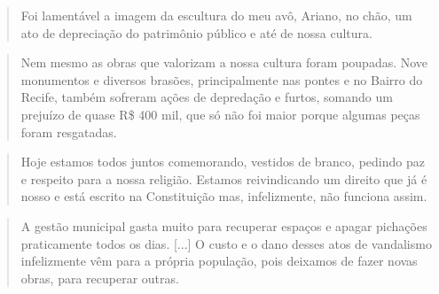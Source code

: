 \begin{escolha}
\item
\begin{quote}
Foi lamentável a imagem da escultura do meu avô, Ariano, no chão, um 
ato de depreciação do patrimônio público e até de nossa cultura.

\end{quote}

\item
\begin{quote}
Nem mesmo as obras que valorizam a nossa cultura foram poupadas. Nove 
monumentos e diversos brasões, principalmente nas pontes e no Bairro 
do Recife, também sofreram ações de depredação e furtos, somando um 
prejuízo de quase R\$ 400 mil, que só não foi maior porque algumas 
peças foram resgatadas.

\end{quote}

\item
\begin{quote}
Hoje estamos todos juntos comemorando, vestidos de branco, pedindo 
paz e respeito para a nossa religião. Estamos reivindicando um direito 
que já é nosso e está escrito na Constituição mas, infelizmente, não 
funciona assim.

\end{quote}

\item
\begin{quote}
A gestão municipal gasta muito para recuperar espaços e apagar 
pichações praticamente todos os dias. {[}...{]} O custo e o 
dano desses atos de vandalismo infelizmente vêm para a própria 
população, pois deixamos de fazer novas obras, para recuperar 
outras.

\end{quote}

\end{escolha}


